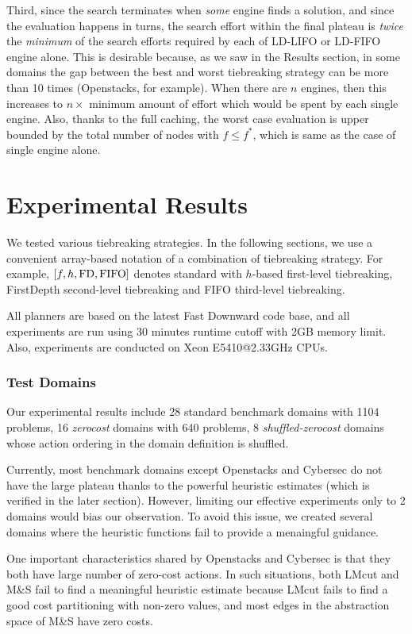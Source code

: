Third, since the search terminates when \emph{some} engine finds a
solution, and since the evaluation happens in turns, the search effort
within the final plateau is \emph{twice} the \emph{minimum} of the
search efforts required by each of LD-LIFO or LD-FIFO engine alone. This
is desirable because, as we saw in the Results section, in some domains the
gap between the best and worst tiebreaking strategy can be more than 10
times (Openstacks, for example).  When there are $n$ engines, then this
increases to $n\times$ minimum amount of effort which would be spent by
each single engine.
Also, thanks to the full caching, the worst case evaluation is
upper bounded by the total number of nodes with $f\leq f^*$, which is same
as the case of single engine alone.

\section{Experimental Results}


We tested various tiebreaking strategies. In the following sections, we
use a convenient array-based notation of a combination of tiebreaking
strategy.  For example, $[f,h,\mbox{FD},\mbox{FIFO}]$ denotes standard \astar with
$h$-based first-level tiebreaking, FirstDepth second-level tiebreaking and FIFO
third-level tiebreaking.

All planners are based on the latest Fast Downward code base, and all
experiments are run using 30 minutes runtime cutoff with 2GB memory
limit. Also, experiments are conducted on Xeon E5410@2.33GHz CPUs.


\subsubsection{Test Domains}
Our experimental results include 28 standard benchmark domains with
1104 problems, 16 \emph{zerocost} domains with 640 problems, 8 \emph{shuffled-zerocost} 
domains whose action ordering in the domain definition is shuffled.

Currently, most benchmark domains except Openstacks and Cybersec do not
have the large plateau thanks to the powerful heuristic estimates (which
is verified in the later section). However, limiting our effective
experiments only to 2 domains would bias our observation. To avoid this
issue, we created several domains where the \sota heuristic functions
fail to provide a menaingful guidance.

One important characteristics shared by Openstacks and Cybersec is that they both
have large number of zero-cost actions. In such situations, both LMcut
and M\&S fail to find a meaningful heuristic estimate because LMcut fails to
find a good cost partitioning with non-zero values, and most edges in the abstraction space of
M\&S have zero costs.


